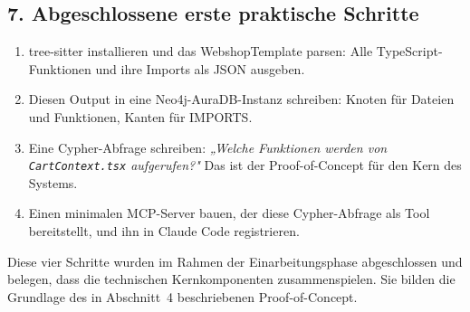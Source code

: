 \subsection*{7. Abgeschlossene erste praktische Schritte}

\begin{enumerate}
  \item tree-sitter installieren und das WebshopTemplate parsen: Alle TypeScript-Funktionen und ihre Imports als JSON ausgeben.
  \item Diesen Output in eine Neo4j-AuraDB-Instanz schreiben: Knoten für Dateien und Funktionen, Kanten für IMPORTS.
  \item Eine Cypher-Abfrage schreiben: \emph{„Welche Funktionen werden von \texttt{CartContext.tsx} aufgerufen?"} Das ist der Proof-of-Concept für den Kern des Systems.
  \item Einen minimalen MCP-Server bauen, der diese Cypher-Abfrage als Tool bereitstellt, und ihn in Claude Code registrieren.
\end{enumerate}

Diese vier Schritte wurden im Rahmen der Einarbeitungsphase abgeschlossen und belegen, dass die technischen Kernkomponenten zusammenspielen. Sie bilden die Grundlage des in Abschnitt~4 beschriebenen Proof-of-Concept.
